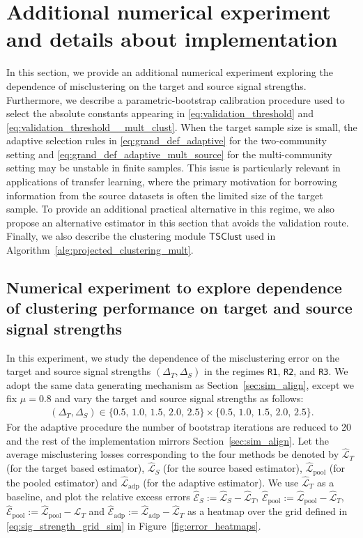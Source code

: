 \documentclass[10pt]{article}
\newcommand{\wh}{\widehat}
\newcommand{\trg}{T}
\newcommand{\DeltaT}{\Delta_{\trg}}
\newcommand{\src}{S}
\newcommand{\DeltaS}{\Delta_{\src}}
\newcommand{\clustmodule}{\mathsf{TSClust}}
\begin{document}
\section{Additional numerical experiment and details about implementation}
In this section, we provide an additional numerical experiment exploring the dependence of misclustering on the target and source signal strengths. Furthermore, we describe a parametric-bootstrap calibration procedure used to select the absolute constants appearing in
\eqref{eq:validation_threshold} and \eqref{eq:validation_threshold__mult_clust}. When the target sample size is small, the adaptive selection rules in \eqref{eq:grand_def_adaptive} for the two-community setting and
\eqref{eq:grand_def_adaptive_mult_source} for the multi-community setting may be unstable in finite samples. This issue is particularly relevant in applications of transfer learning, where the primary motivation for borrowing information from the source datasets is often the limited size of the target sample. To provide an additional practical alternative in this regime, we also
propose an alternative estimator in this section that avoids the validation route. Finally, we also describe the clustering module $\clustmodule{}$ used in Algorithm~\ref{alg:projected_clustering_mult}.


\subsection{Numerical experiment to explore dependence of clustering performance on target and source signal strengths}
\label{sec:sim_sig_strength}
In this experiment, we study the dependence of the misclustering error on the target and source signal strengths $(\DeltaT,\DeltaS)$ in the regimes \texttt{R1}, \texttt{R2}, and \texttt{R3}. We adopt the same data generating mechanism as Section~\ref{sec:sim_align}, except we fix $\mu=0.8$ and vary the target and source signal strengths as follows:
\begin{align}
\label{eq:sig_strength_grid_sim}
(\DeltaT,\DeltaS) \in \{0.5,\,1.0,\,1.5,\,2.0,\,2.5\} \times \{0.5,\,1.0,\,1.5,\,2.0,\,2.5\}.
\end{align}
For the adaptive procedure the number of bootstrap iterations are reduced to 20 and the rest of the implementation mirrors Section~\ref{sec:sim_align}.
Let the average misclustering losses corresponding to the four methods be denoted by $\wh{\mathcal L}_\trg$ (for the target based estimator), $\wh{\mathcal L}_\src$ (for the source based estimator), $\wh{\mathcal L}_{\mathrm{pool}}$ (for the pooled estimator) and $\wh{\mathcal L}_{\mathrm{adp}}$ (for the adaptive estimator). We use $\wh{\mathcal L}_\trg$ as a baseline, and plot the relative excess errors $\wh{\mathcal E}_\src:=\wh{\mathcal L}_\src-\wh{\mathcal L}_\trg$, $\wh{\mathcal E}_{\mathrm{pool}}:=\wh{\mathcal L}_{\mathrm{pool}}-\wh{\mathcal L}_\trg$, $\wh{\mathcal E}_{\mathrm{pool}}:=\wh{\mathcal L}_{\mathrm{pool}}-\wh{\mathcal L}_\trg$ and $\wh{\mathcal E}_{\mathrm{adp}}:=\wh{\mathcal L}_{\mathrm{adp}}-\wh{\mathcal L}_\trg$ as a heatmap over the grid defined in \eqref{eq:sig_strength_grid_sim} in Figure~\ref{fig:error_heatmaps}.
\end{document}
